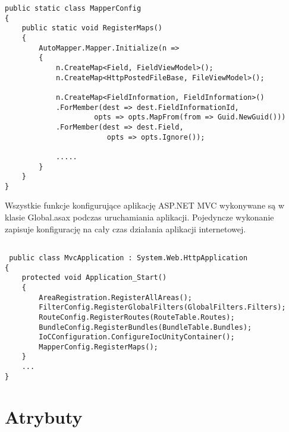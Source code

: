 \begin{lstlisting}[caption=Konfiguracja biblioteki Automapper]
public static class MapperConfig
{
	public static void RegisterMaps()
	{
		AutoMapper.Mapper.Initialize(n =>
		{
			n.CreateMap<Field, FieldViewModel>();
			n.CreateMap<HttpPostedFileBase, FileViewModel>();
			
			n.CreateMap<FieldInformation, FieldInformation>()
			.ForMember(dest => dest.FieldInformationId,
					 opts => opts.MapFrom(from => Guid.NewGuid()))
			.ForMember(dest => dest.Field, 
						opts => opts.Ignore());
						
			.....
		}
	}
}

\end{lstlisting}

Wszystkie funkcje konfigurujące aplikację ASP.NET MVC wykonywane są w klasie Global.asax podczas uruchamiania aplikacji. Pojedyncze wykonanie zapisuje konfigurację na cały czas działania aplikacji internetowej. 


\begin{lstlisting}[caption=Konfiguracja aplikacji]

 public class MvcApplication : System.Web.HttpApplication
{
	protected void Application_Start()
	{
		AreaRegistration.RegisterAllAreas();
		FilterConfig.RegisterGlobalFilters(GlobalFilters.Filters);
		RouteConfig.RegisterRoutes(RouteTable.Routes);
		BundleConfig.RegisterBundles(BundleTable.Bundles);
		IoCConfiguration.ConfigureIocUnityContainer();
		MapperConfig.RegisterMaps();
	}
	...
}
\end{lstlisting}

\section{Atrybuty}

